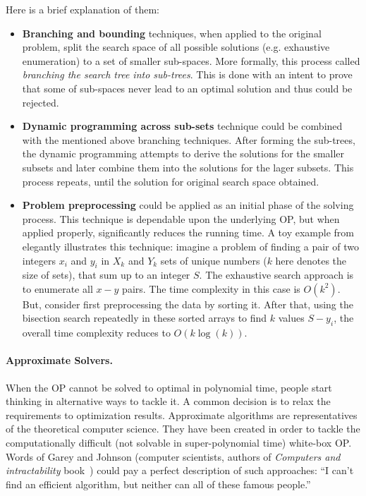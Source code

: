 Here is a brief explanation of them:
\begin{itemize}[itemsep=8pt]
	\item \textbf{Branching and bounding} techniques, when applied to the original problem, split the search space of all possible solutions (e.g. exhaustive enumeration) to a set of smaller sub-spaces. More formally, this process called \emph{branching the search tree into sub-trees}. This is done with an intent to prove that some of sub-spaces never lead to an optimal solution and thus could be rejected.
	
	\item \textbf{Dynamic programming across sub-sets} technique could be combined with the mentioned above branching techniques. After forming the sub-trees, the dynamic programming attempts to derive the solutions for the smaller subsets and later combine them into the solutions for the lager subsets. This process repeats, until the solution for original search space obtained.
	
	\item \textbf{Problem preprocessing} could be applied as an initial phase of the solving process. This technique is dependable upon the underlying OP, but when applied properly, significantly reduces the running time. A toy example from~\cite{woeginger2003exact} elegantly illustrates this technique: imagine a problem of finding a pair of two integers $x_i$ and $y_i$ in $X_k$ and $Y_k$ sets of unique numbers ($k$ here denotes the size of sets), that sum up to an integer $S$. The exhaustive search approach is to enumerate all $x-y$ pairs. The time complexity in this case is $O(k^2)$. But, consider first preprocessing the data by sorting it. After that, using the bisection search repeatedly in these sorted arrays to find $k$ values $S - y_i$, the overall time complexity reduces to $O(k\log(k))$.
\end{itemize}

\paragraph{Approximate Solvers.} When the OP cannot be solved to optimal in polynomial time, people start thinking in alternative ways to tackle it. A common decision is to relax the requirements to optimization results.
Approximate algorithms are representatives of the theoretical computer science. They have been created in order to tackle the computationally difficult (not solvable in super-polynomial time) white-box OP. Words of Garey and Johnson (computer scientists, authors of \textit{Computers and intractability} book~\cite{garey1979computers}) could pay a perfect description of such approaches: ``I can't find an efficient algorithm, but neither can all of these famous people.''

